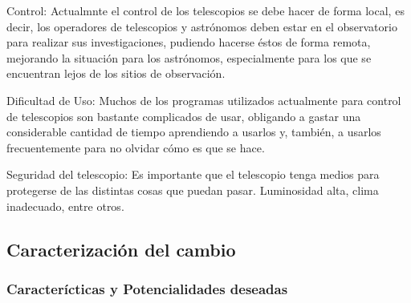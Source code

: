 \documentclass[letterpaper,spanish,10pt]{article}
\begin{document}
Control: Actualmnte el control de los telescopios se debe hacer de forma local, es decir, los operadores de telescopios y astr\'onomos deben estar en el observatorio para realizar sus investigaciones, pudiendo hacerse \'estos de forma remota, mejorando la situaci\'on para los astr\'onomos, especialmente para los que se encuentran lejos de los sitios de observaci\'on.

Dificultad de Uso: Muchos de los programas utilizados actualmente para control de telescopios son bastante complicados de usar, obligando a gastar una considerable cantidad de tiempo aprendiendo a usarlos y, tambi\'en, a usarlos frecuentemente para no olvidar c\'omo es que se hace.

Seguridad del telescopio: Es importante que el telescopio tenga medios para protegerse de las distintas cosas que puedan pasar. Luminosidad alta, clima inadecuado, entre otros. 

\newpage

\subsection{Caracterizaci\'on del cambio}
\subsubsection{Caracter\'icticas y Potencialidades deseadas}
\end{document}
